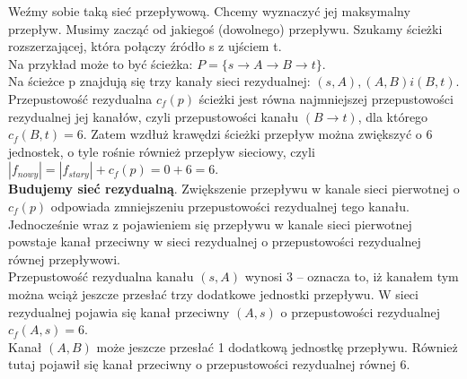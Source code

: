 \documentclass[12pt]{article}
\begin{document}
\begin{center}
    \end{center}

    Weźmy sobie taką sieć przepływową. Chcemy wyznaczyć jej maksymalny przepływ. Musimy zacząć od jakiegoś (dowolnego)
    przepływu. Szukamy ścieżki rozszerzającej, która połączy źródło s z ujściem t.\\

    Na przykład może to być ścieżka: $P = \{ s  \rightarrow A \rightarrow B \rightarrow t \}$.\\

    Na ścieżce p znajdują się trzy kanały sieci rezydualnej: $(s,A), (A,B) i (B,t)$. Przepustowość rezydualna $c_f(p)$
    ścieżki jest równa najmniejszej przepustowości rezydualnej jej kanałów, czyli przepustowości kanału $(B \rightarrow t)$,
    dla którego $c_f (B,t) = 6$. Zatem wzdłuż krawędzi ścieżki przepływ można zwiększyć o 6 jednostek, o tyle rośnie
    również przepływ sieciowy, czyli $|f_{nowy}| = |f_{stary}| + c_f(p) = 0 + 6 = 6$.\\

    \textbf{Budujemy sieć rezydualną}. Zwiększenie przepływu w kanale sieci pierwotnej o $c_f(p)$ odpowiada
    zmniejszeniu przepustowości rezydualnej tego kanału. Jednocześnie wraz z pojawieniem się przepływu w kanale sieci
    pierwotnej powstaje kanał przeciwny w sieci rezydualnej o przepustowości rezydualnej równej przepływowi.\\

    Przepustowość rezydualna kanału $(s,A)$ wynosi 3 – oznacza to, iż kanałem tym można wciąż jeszcze przesłać trzy
    dodatkowe jednostki przepływu. W sieci rezydualnej pojawia się kanał przeciwny $(A,s)$ o przepustowości rezydualnej
    $c_f(A,s) = 6$.\\

    Kanał $(A,B)$ może jeszcze przesłać 1 dodatkową jednostkę przepływu. Również tutaj pojawił się kanał przeciwny o
    przepustowości rezydualnej równej 6.\\
\end{document}
